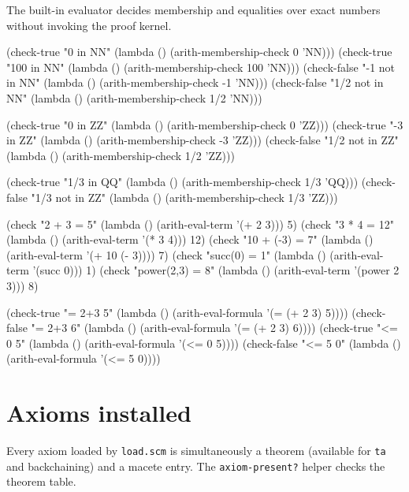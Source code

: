 The built-in evaluator decides membership and equalities over exact
numbers without invoking the proof kernel.

\begin{VNBcode}
(check-true  "0 in NN"        (lambda () (arith-membership-check 0   'NN)))
(check-true  "100 in NN"      (lambda () (arith-membership-check 100 'NN)))
(check-false "-1 not in NN"   (lambda () (arith-membership-check -1  'NN)))
(check-false "1/2 not in NN"  (lambda () (arith-membership-check 1/2 'NN)))

(check-true  "0 in ZZ"        (lambda () (arith-membership-check 0   'ZZ)))
(check-true  "-3 in ZZ"       (lambda () (arith-membership-check -3  'ZZ)))
(check-false "1/2 not in ZZ"  (lambda () (arith-membership-check 1/2 'ZZ)))

(check-true  "1/3 in QQ"      (lambda () (arith-membership-check 1/3 'QQ)))
(check-false "1/3 not in ZZ"  (lambda () (arith-membership-check 1/3 'ZZ)))

(check "2 + 3 = 5"       (lambda () (arith-eval-term '(+ 2 3)))     5)
(check "3 * 4 = 12"      (lambda () (arith-eval-term '(* 3 4)))     12)
(check "10 + (-3) = 7"   (lambda () (arith-eval-term '(+ 10 (- 3)))) 7)
(check "succ(0) = 1"     (lambda () (arith-eval-term '(succ 0)))    1)
(check "power(2,3) = 8"  (lambda () (arith-eval-term '(power 2 3))) 8)

(check-true  "= 2+3 5"   (lambda () (arith-eval-formula '(= (+ 2 3) 5))))
(check-false "= 2+3 6"   (lambda () (arith-eval-formula '(= (+ 2 3) 6))))
(check-true  "<= 0 5"    (lambda () (arith-eval-formula '(<= 0 5))))
(check-false "<= 5 0"    (lambda () (arith-eval-formula '(<= 5 0))))
\end{VNBcode}

\section{Axioms installed}

Every axiom loaded by \texttt{load.scm} is simultaneously a theorem
(available for \texttt{ta} and backchaining) and a macete entry.
The \texttt{axiom-present?} helper checks the theorem table.

